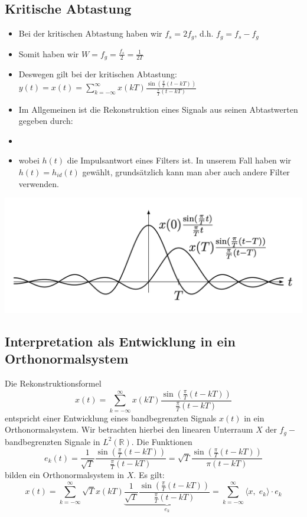 \documentclass[11pt]{article}
\begin{document}
\vfill \null
\pagebreak

\subsection*{Kritische Abtastung}
\vspace*{-0.5cm}
\begin{itemize}[leftmargin=0pt]
    \item[] Bei der kritischen Abtastung haben wir $f_s = 2 f_g$, d.h. $f_g = f_s - f_g$
    \item[] Somit haben wir $W = f_g = \frac{f_s}{2} = \frac{1}{2T}$
    \item[] Deswegen gilt bei der kritischen Abtastung: $y(t) = x(t) = \displaystyle\sum_{k=-\infty}^\infty x(kT)\displaystyle\frac{\sin\left(\frac{\pi}{T}(t-kT)\right)}{\frac{\pi}{T}(t-kT)}$
    \item[] Im Allgemeinen ist die Rekonstruktion eines Signals aus seinen Abtastwerten gegeben durch:
    \item[] 
    \item[] wobei $h(t)$ die Impulsantwort eines Filters ist. In unserem Fall haben wir $h(t) = h_{id}(t)$ gewählt, grundsätzlich kann man aber auch andere Filter verwenden.
\end{itemize}

\begin{center}
    \includegraphics[width=0.6\linewidth]{docimgs/orthonormalsys.png}
\end{center}

\subsection*{Interpretation als Entwicklung in ein Orthonormalsystem}
\vspace*{-0.5cm}

Die Rekonstruktionsformel
$$x(t) = \sum_{k=-\infty}^\infty x(kT)\displaystyle\frac{\sin\left(\frac{\pi}{T}(t-kT)\right)}{\frac{\pi}{T}(t-kT)}$$
entspricht einer Entwicklung eines bandbegrenzten Signals $x(t)$ in ein Orthonormalsystem. Wir betrachten hierbei den linearen Unterraum $X$ der $f_g-$bandbegrenzten Signale in $L^2(\mathbb{R})$. Die Funktionen
$$e_k(t) = \frac{1}{\sqrt{T}}\frac{\sin\left(\frac{\pi}{T}(t-kT)\right)}{\frac{\pi}{T}(t-kT)} = \sqrt{T} \frac{\sin\left(\frac{\pi}{T}(t-kT)\right)}{\pi(t-kT)}$$
bilden ein Orthonormalsystem in $X$. Es gilt:
$$x(t) = \sum_{k=-\infty}^\infty \sqrt{T}x(kT)\underbrace{\frac{1}{\sqrt{T}}\frac{\sin\left(\frac{\pi}{T}(t-kT)\right)}{\frac{\pi}{T}(t-kT)}}_{e_k} = \sum_{k = -\infty}^\infty \langle x, \; e_k \rangle \cdot e_k$$
\end{document}
